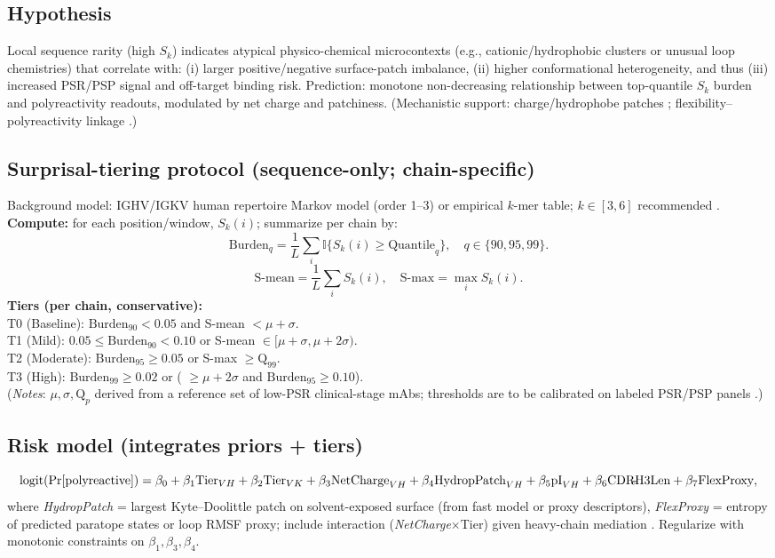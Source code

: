 \subsection*{Hypothesis}
Local sequence rarity (high $S_k$) indicates atypical physico-chemical microcontexts (e.g., cationic/hydrophobic clusters or unusual loop chemistries) that correlate with: (i) larger positive/negative surface-patch imbalance, (ii) higher conformational heterogeneity, and thus (iii) increased PSR/PSP signal and off-target binding risk. Prediction: monotone non-decreasing relationship between top-quantile $S_k$ burden and polyreactivity readouts, modulated by net charge and patchiness. (Mechanistic support: charge/hydrophobe patches \cite{Chen2024,Ausserwoger2023}; flexibility–polyreactivity linkage \cite{Shehata2019,FQ2020states,Guthmiller2020}.)

\subsection*{Surprisal-tiering protocol (sequence-only; chain-specific)}
\noindent Background model: IGHV/IGKV human repertoire Markov model (order 1–3) or empirical $k$-mer table; $k\in[3,6]$ recommended \cite{Humphrey2020}.\\
\textbf{Compute:} for each position/window, $S_k(i)$; summarize per chain by:
\[
\text{Burden}_{q} = \frac{1}{L}\sum_{i} \mathbb{I}\{S_k(i)\ge \text{Quantile}_q\},\quad q\in\{90,95,99\}.
\]
\[
\text{S-mean}=\frac{1}{L}\sum_i S_k(i),\quad \text{S-max}=\max_i S_k(i).
\]
\textbf{Tiers (per chain, conservative):}\\
T0 (Baseline): $\text{Burden}_{90}<0.05$ and S-mean $<\mu+\sigma$.\\
T1 (Mild): $0.05\le\text{Burden}_{90}<0.10$ or S-mean $\in[\mu+\sigma,\mu+2\sigma)$.\\
T2 (Moderate): $\text{Burden}_{95}\ge0.05$ or S-max $\ge \text{Q}_{99}$.\\
T3 (High): $\text{Burden}_{99}\ge0.02$ or ( $\ge \mu+2\sigma$ and $\text{Burden}_{95}\ge0.10$).\\
(\emph{Notes}: $\mu,\sigma,\text{Q}_p$ derived from a reference set of low-PSR clinical-stage mAbs; thresholds are to be calibrated on labeled PSR/PSP panels \cite{Makowski2021,Herling2023}.)

\subsection*{Risk model (integrates priors + tiers)}
\[
\text{logit}(\Pr[\text{polyreactive}]) = \beta_0 + \beta_1 \text{Tier}_{VH} + \beta_2 \text{Tier}_{VK} + \beta_3 \text{NetCharge}_{VH} + \beta_4 \text{HydropPatch}_{VH} + \beta_5 \text{pI}_{VH} + \beta_6 \text{CDR\!-\!H3Len} + \beta_7 \text{FlexProxy},
\]
where \textit{HydropPatch} = largest Kyte–Doolittle patch on solvent-exposed surface (from fast model or proxy descriptors), \textit{FlexProxy} = entropy of predicted paratope states or loop RMSF proxy; include interaction (\textit{NetCharge}$\times$Tier) given heavy-chain mediation \cite{Chen2024,Shehata2019,FQ2020states}. Regularize with monotonic constraints on $\beta_1,\beta_3,\beta_4$.

